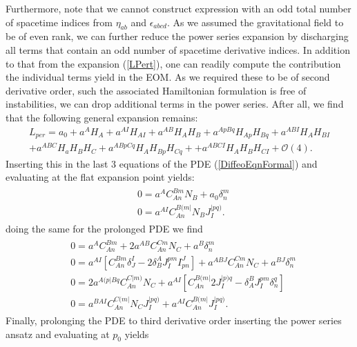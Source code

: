 Furthermore, note that we cannot construct expression with an odd total number of spacetime indices from $\eta_{ab}$ and $\epsilon_{abcd}$. As we assumed the gravitational field to be of even rank, we can further reduce the power series expansion by discharging all terms that contain an odd number of spacetime derivative indices. In addition to that from the expansion (\ref{LPert}), one can readily compute the contribution the individual terms yield in the EOM.  As we required these to be of second derivative order, such the associated Hamiltonian formulation is free of instabilities, we can drop additional terms in the power series. After all, we find that the following general expansion remains: 
\begin{multline}\label{LperRed}
     L_{per} = a_0 + a^A H_A + a^{AI}H_{AI} + a^{AB} H_{A}H_{B} + a^{ApBq} H_{Ap}H_{Bq} + a^{ABI} H_{A} H_{BI} \\
    + a^{ABC} H_a H_B H_C + a^{ABpCq} H_{A}H_{Bp}H_{Cq} +
    + a^{ABCI} H_A H_B H_{CI} 
    + \mathcal{O}(4).
\end{multline}
Inserting this in the last 3 equations of the PDE (\ref{DiffeoEqnFormal}) and evaluating at the flat expansion point yields:
\begin{align}\label{order1}
    \begin{aligned}
    &0 = a^A C_{An}^{Bm}N_B + a_0 \delta^m_n\\
    &0 = a^{AI}C_{An}^{B(m\vert }N_B J^{\vert pq)}_I.
    \end{aligned}
\end{align}
doing the same for the prolonged PDE we find 
\begin{align}\label{order2}
    \begin{aligned}
    &0 = a^A C_{An}^{Bm} + 2 a^{AB}C_{An}^{Cm}N_C + a^B\delta^m_n\\
    &0 = a^{AI}\left [C_{An}^{Bm}\delta^I _J- 2 \delta^A_B J_I^{pm}I^J_{pn} \right ] + a^{ABJ}C_{An}^{Cm}N_C + a^{BJ} \delta^m_n \\
    &0 = 2a^{A(p\vert Bq}C_{An}^{C\vert m)}N_C + a^{AI} \left [C_{An}^{B(m\vert} 2 J_{I}^{\vert p)q} - \delta_A^BJ_I^{pm}\delta^q_n \right ]\\
    &0 = a^{BAI}C_{An}^{C(m\vert}N_CJ_I^{\vert pq)} + a^{AI}C_{An}^{B(m \vert} J_I^{\vert pq)}.
    \end{aligned}
\end{align}
Finally, prolonging the PDE to third derivative order inserting the power series ansatz and evaluating at $p_0$ yields
